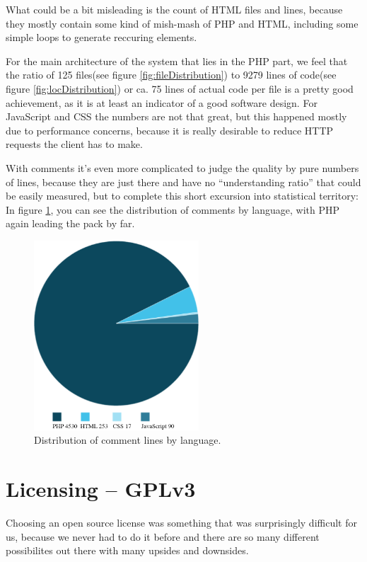 What could be a bit misleading is the count of HTML files and lines, because they mostly contain some kind of mish-mash of PHP and HTML, including some simple loops to generate reccuring elements.

For the main architecture of the system that lies in the PHP part, we feel that the ratio of 125 files(see figure \ref{fig:fileDistribution}) to 9279 lines of code(see figure \ref{fig:locDistribution}) or ca. 75 lines of actual code per file is a pretty good achievement, as it is at least an indicator of a good software design. For JavaScript and CSS the numbers 
are not that great, but this happened mostly due to performance concerns, because it is 
really desirable to reduce HTTP requests the client has to make.

With comments it's even more complicated to judge the quality by pure numbers of lines,
because they are just there and have no \enquote{understanding ratio} that could be easily measured, but to complete this short excursion into statistical territory: In figure \ref{fig:commentDistribution}, you can see the distribution of comments by language, with PHP again leading the pack by far.

\begin{figure}[!h]
  \centering
    \includegraphics[width=0.55\textwidth]{images/comments.png}
  \caption{Distribution of comment lines by language.}
  \label{fig:commentDistribution}
\end{figure}

\section{Licensing -- GPLv3}

Choosing an open source license was something that was surprisingly difficult for us,
because we never had to do it before and there are so many different possibilites out there with many upsides and downsides.

